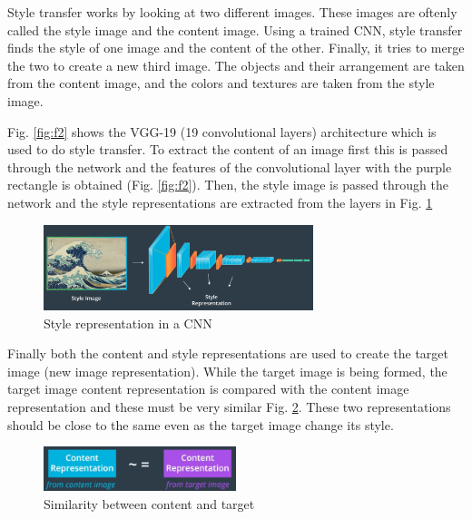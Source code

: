 \documentclass{article}
\begin{document}
Style transfer works by looking at two different images. These images are oftenly called the style image and the content image. Using a trained CNN, style transfer finds the style of one image and the content of the other. Finally, it tries to merge the two to create a new third image. The objects and their arrangement are taken from the content image, and the colors and textures are taken from the style image.

Fig. \ref{fig:f2} shows the VGG-19 (19 convolutional layers) architecture which is used to do style transfer. To extract the content of an image first this is passed through the network and the features of the convolutional layer with the purple rectangle is obtained (Fig. \ref{fig:f2}). Then, the style image is passed through the network and the style representations are extracted from the layers in Fig. \ref{fig:f4}

\begin{figure}[ht]
    \centering
    \includegraphics[width=0.7\textwidth,height=0.7\textheight,keepaspectratio]{images/style_cnn.png}
    \captionsetup{justification=centering}
    \caption{Style representation in a CNN}
    \label{fig:f4}
\end{figure}

Finally both the content and style representations are used to create the target image (new image representation). While the target image is being formed, the target image content representation is compared with the content image representation and these must be very similar Fig. \ref{fig:f5}. These two representations should be close to the same even as the target image change its style.

\begin{figure}[ht]
    \centering
    \includegraphics[width=0.5\textwidth,height=0.5\textheight,keepaspectratio]{images/content_target.png}
    \captionsetup{justification=centering}
    \caption{Similarity between content and target}
    \label{fig:f5}
\end{figure}
\end{document}
